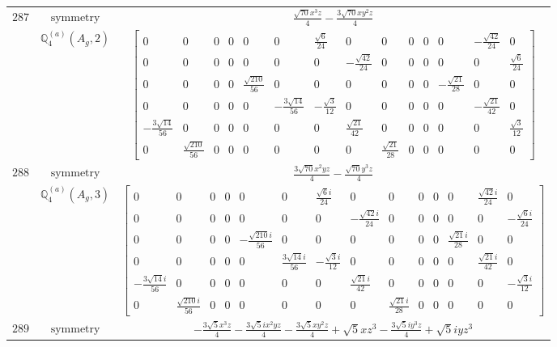 \documentclass[fleqn,8pt,landscape]{jsarticle}
\begin{document}
\begin{longtable}{ccc}
$ 287 $ & $ \text{symmetry} $ & $ \frac{\sqrt{70} x^{3} z}{4} - \frac{3 \sqrt{70} x y^{2} z}{4} $ \\
$  $ & $ \mathbb{Q}_{4}^{(a)}(A_{g},2) $ & $ \begin{bmatrix} 0 & 0 & 0 & 0 & 0 & 0 & \frac{\sqrt{6}}{24} & 0 & 0 & 0 & 0 & 0 & - \frac{\sqrt{42}}{24} & 0 \\ 0 & 0 & 0 & 0 & 0 & 0 & 0 & - \frac{\sqrt{42}}{24} & 0 & 0 & 0 & 0 & 0 & \frac{\sqrt{6}}{24} \\ 0 & 0 & 0 & 0 & \frac{\sqrt{210}}{56} & 0 & 0 & 0 & 0 & 0 & 0 & - \frac{\sqrt{21}}{28} & 0 & 0 \\ 0 & 0 & 0 & 0 & 0 & - \frac{3 \sqrt{14}}{56} & - \frac{\sqrt{3}}{12} & 0 & 0 & 0 & 0 & 0 & - \frac{\sqrt{21}}{42} & 0 \\ - \frac{3 \sqrt{14}}{56} & 0 & 0 & 0 & 0 & 0 & 0 & \frac{\sqrt{21}}{42} & 0 & 0 & 0 & 0 & 0 & \frac{\sqrt{3}}{12} \\ 0 & \frac{\sqrt{210}}{56} & 0 & 0 & 0 & 0 & 0 & 0 & \frac{\sqrt{21}}{28} & 0 & 0 & 0 & 0 & 0 \end{bmatrix} $ \\ \hline
$ 288 $ & $ \text{symmetry} $ & $ \frac{3 \sqrt{70} x^{2} y z}{4} - \frac{\sqrt{70} y^{3} z}{4} $ \\
$  $ & $ \mathbb{Q}_{4}^{(a)}(A_{g},3) $ & $ \begin{bmatrix} 0 & 0 & 0 & 0 & 0 & 0 & \frac{\sqrt{6} i}{24} & 0 & 0 & 0 & 0 & 0 & \frac{\sqrt{42} i}{24} & 0 \\ 0 & 0 & 0 & 0 & 0 & 0 & 0 & - \frac{\sqrt{42} i}{24} & 0 & 0 & 0 & 0 & 0 & - \frac{\sqrt{6} i}{24} \\ 0 & 0 & 0 & 0 & - \frac{\sqrt{210} i}{56} & 0 & 0 & 0 & 0 & 0 & 0 & \frac{\sqrt{21} i}{28} & 0 & 0 \\ 0 & 0 & 0 & 0 & 0 & \frac{3 \sqrt{14} i}{56} & - \frac{\sqrt{3} i}{12} & 0 & 0 & 0 & 0 & 0 & \frac{\sqrt{21} i}{42} & 0 \\ - \frac{3 \sqrt{14} i}{56} & 0 & 0 & 0 & 0 & 0 & 0 & \frac{\sqrt{21} i}{42} & 0 & 0 & 0 & 0 & 0 & - \frac{\sqrt{3} i}{12} \\ 0 & \frac{\sqrt{210} i}{56} & 0 & 0 & 0 & 0 & 0 & 0 & \frac{\sqrt{21} i}{28} & 0 & 0 & 0 & 0 & 0 \end{bmatrix} $ \\ \hline
$ 289 $ & $ \text{symmetry} $ & $ - \frac{3 \sqrt{5} x^{3} z}{4} - \frac{3 \sqrt{5} i x^{2} y z}{4} - \frac{3 \sqrt{5} x y^{2} z}{4} + \sqrt{5} x z^{3} - \frac{3 \sqrt{5} i y^{3} z}{4} + \sqrt{5} i y z^{3} $ \\

\end{longtable}
\end{document}
